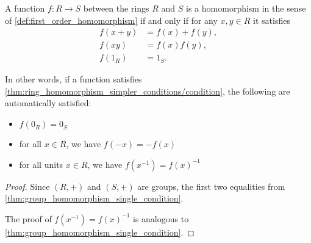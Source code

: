\begin{proposition}\label{thm:ring_homomorphism_simpler_conditions}
  A function \( f: R \to S \) between the rings \( R \) and \( S \) is a homomorphism in the sense of \cref{def:first_order_homomorphism} if and only if for any \( x, y \in R \) it satisfies
  \begin{align}\label{thm:ring_homomorphism_simpler_conditions/condition}
    f(x + y) &= f(x) + f(y), \\
    f(xy) &= f(x) f(y), \\
    f(1_R) &= 1_S.
  \end{align}

  In other words, if a function satisfies \cref{thm:ring_homomorphism_simpler_conditions/condition}, the following are automatically satisfied:
  \begin{itemize}
    \item \( f(0_R) = 0_S \)
    \item for all \( x \in R \), we have \( f(-x) = -f(x) \)
    \item for all units \( x \in R \), we have \( f(x^{-1}) = f(x)^{-1} \)
  \end{itemize}
\end{proposition}
\begin{proof}
  Since \( (R, +) \) and \( (S, +) \) are groups, the first two equalities from \cref{thm:group_homomorphism_single_condition}.

  The proof of \( f(x^{-1}) = f(x)^{-1} \) is analogous to \cref{thm:group_homomorphism_single_condition}.
\end{proof}


